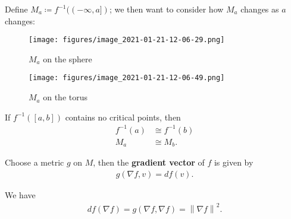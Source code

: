 \begin{remark}

Define \(M_a \coloneqq f ^{-1} ((- \infty , a])\); we then want to
consider how \(M_a\) changes as \(a\) changes:

\begin{figure}
\centering
\texttt{[image: figures/image\_2021-01-21-12-06-29.png]}
\caption{\(M_a\) on the sphere}
\end{figure}

\begin{figure}
\centering
\texttt{[image: figures/image\_2021-01-21-12-06-49.png]}
\caption{\(M_a\) on the torus}
\end{figure}

\end{remark}

\begin{lemma}[?]

If \(f ^{-1} ([a, b])\) contains no critical points, then
\begin{align*}
f ^{-1} (a) &\cong f ^{-1} (b) \\
M_a &\cong M_b
.\end{align*}

\end{lemma}

\begin{definition}[Gradients]

Choose a metric \(g\) on \(M\), then the \textbf{gradient vector} of
\(f\) is given by
\begin{align*}
g(\nabla f, v) = df(v)
.\end{align*}

\end{definition}

\begin{remark}

We have
\begin{align*}
df( \nabla f) = g(\nabla f, \nabla f) = {\left\lVert {\nabla f} \right\rVert}^2
.\end{align*}

\end{remark}

